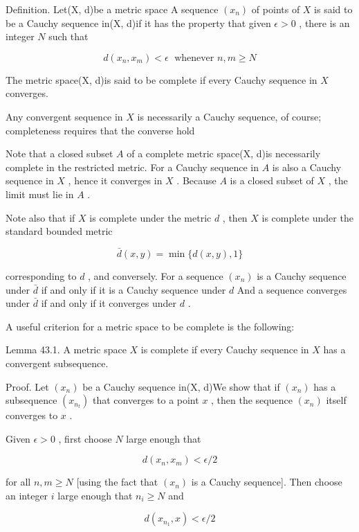 Definition. Let(X, d)be a metric space A sequence \(\left( {x}_{n}\right)\) of points of \(X\) is said to be a Cauchy sequence in(X, d)if it has the property that given \(\epsilon  > 0\) , there is an integer \(N\) such that

\[
d\left( {{x}_{n},{x}_{m}}\right)  < \epsilon \;\text{ whenever }n,m \geq  N
\]

The metric space(X, d)is said to be complete if every Cauchy sequence in \(X\) converges.

Any convergent sequence in \(X\) is necessarily a Cauchy sequence, of course; completeness requires that the converse hold

Note that a closed subset \(A\) of a complete metric space(X, d)is necessarily complete in the restricted metric. For a Cauchy sequence in \(A\) is also a Cauchy sequence in \(X\) , hence it converges in \(X\) . Because \(A\) is a closed subset of \(X\) , the limit must lie in \(A\) .

Note also that if \(X\) is complete under the metric \(d\) , then \(X\) is complete under the standard bounded metric

\[
\bar{d}\left( {x,y}\right)  = \min \{ d\left( {x,y}\right) ,1\}
\]

corresponding to \(d\) , and conversely. For a sequence \(\left( {x}_{n}\right)\) is a Cauchy sequence under \(\bar{d}\) if and only if it is a Cauchy sequence under \(d\) And a sequence converges under \(\bar{d}\) if and only if it converges under \(d\) .

A useful criterion for a metric space to be complete is the following:

Lemma 43.1. A metric space \(X\) is complete if every Cauchy sequence in \(X\) has a convergent subsequence.

Proof. Let \(\left( {x}_{n}\right)\) be a Cauchy sequence in(X, d)We show that if \(\left( {x}_{n}\right)\) has a subsequence \(\left( {x}_{{n}_{t}}\right)\) that converges to a point \(x\) , then the sequence \(\left( {x}_{n}\right)\) itself converges to \(x\) .

Given \(\epsilon  > 0\) , first choose \(N\) large enough that

\[
d\left( {{x}_{n},{x}_{m}}\right)  < \epsilon /2
\]

for all \(n,m \geq  N\) [using the fact that \(\left( {x}_{n}\right)\) is a Cauchy sequence]. Then choose an integer \(i\) large enough that \({n}_{i} \geq  N\) and

\[
d\left( {{x}_{{n}_{1}},x}\right)  < \epsilon /2
\]

